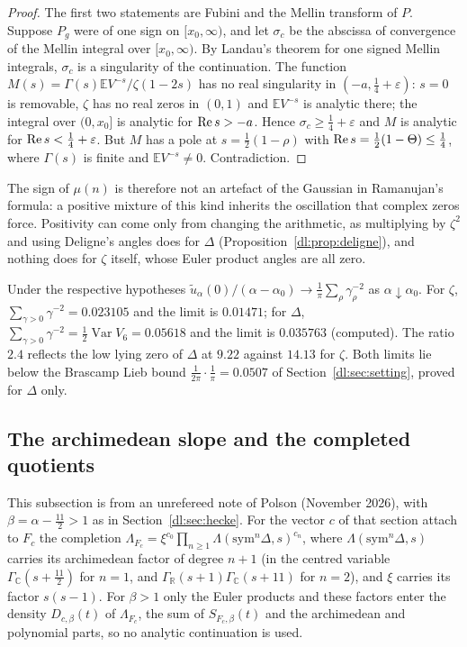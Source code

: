 \begin{proof}
The first two statements are Fubini and the Mellin transform of $P$. Suppose $P_g$ were of one sign on $[x_0,\infty)$, and let $\sigma_c$ be the abscissa of convergence of the Mellin integral over $[x_0,\infty)$. By Landau's theorem for one signed Mellin integrals, $\sigma_c$ is a singularity of the continuation. The function $M(s)=\Gamma(s)\mathbb EV^{-s}/\zeta(1-2s)$ has no real singularity in $(-a,\frac14+\varepsilon)$: $s=0$ is removable, $\zeta$ has no real zeros in $(0,1)$ and $\mathbb EV^{-s}$ is analytic there; the integral over $(0,x_0]$ is analytic for $\operatorname{Re} s>-a$. Hence $\sigma_c\ge\frac14+\varepsilon$ and $M$ is analytic for $\operatorname{Re} s<\frac14+\varepsilon$. But $M$ has a pole at $s=\frac12(1-\rho)$ with $\operatorname{Re} s=\frac12(1-\Theta)\le\frac14$, where $\Gamma(s)$ is finite and $\mathbb EV^{-s}\ne0$. Contradiction.
\end{proof}

The sign of $\mu(n)$ is therefore not an artefact of the Gaussian in Ramanujan's formula: a positive mixture of this kind inherits the oscillation that complex zeros force. Positivity can come only from changing the arithmetic, as multiplying by $\zeta^2$ and using Deligne's angles does for $\Delta$ (Proposition~\ref{dl:prop:deligne}), and nothing does for $\zeta$ itself, whose Euler product angles are all zero.

\begin{remark}\label{dl:rem:r6}
Under the respective hypotheses $\tilde u_\alpha(0)/(\alpha-\alpha_0)\to\frac1\pi\sum_\rho\gamma_\rho^{-2}$ as $\alpha\downarrow\alpha_0$. For $\zeta$, $\sum_{\gamma>0}\gamma^{-2}=0.023105$ and the limit is $0.01471$; for $\Delta$, $\sum_{\gamma>0}\gamma^{-2}=\frac12\operatorname{Var}V_6=0.05618$ and the limit is $0.035763$ (computed). The ratio $2.4$ reflects the low lying zero of $\Delta$ at $9.22$ against $14.13$ for $\zeta$. Both limits lie below the Brascamp Lieb bound $\frac1{2\pi}\cdot\frac1\pi=0.0507$ of Section~\ref{dl:sec:setting}, proved for $\Delta$ only.
\end{remark}

\subsection{The archimedean slope and the completed quotients}\label{dl:sec:slope}

This subsection is from an unrefereed note of Polson (November 2026), with $\beta=\alpha-\frac{11}2>1$ as in Section~\ref{dl:sec:hecke}. For the vector $c$ of that section attach to $F_c$ the completion $\Lambda_{F_c}=\xi^{c_0}\prod_{n\ge1}\Lambda(\mathrm{sym}^n\Delta,s)^{c_n}$, where $\Lambda(\mathrm{sym}^n\Delta,s)$ carries its archimedean factor of degree $n+1$ (in the centred variable $\Gamma_{\mathbb C}(s+\frac{11}2)$ for $n=1$, and $\Gamma_{\mathbb R}(s+1)\Gamma_{\mathbb C}(s+11)$ for $n=2$), and $\xi$ carries its factor $s(s-1)$. For $\beta>1$ only the Euler products and these factors enter the density $D_{c,\beta}(t)$ of $\Lambda_{F_c}$, the sum of $S_{F_c,\beta}(t)$ and the archimedean and polynomial parts, so no analytic continuation is used.

